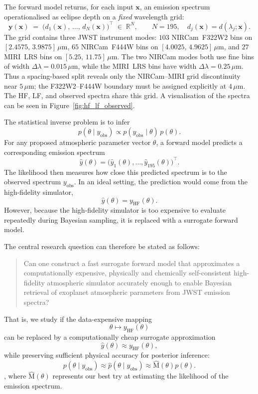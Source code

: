 \documentclass[11pt,a4paper]{article}
\newcommand{\xv}{\bm{x}}
\newcommand{\yv}{\bm{y}}
\begin{document}
The forward model returns, for each input $\xv$, an emission spectrum
operationalised as eclipse depth on a \emph{fixed} wavelength grid:
\[
    \yv(\xv) \;=\; \bigl(d_{1}(\xv),\,\dots,\,d_{N}(\xv)\bigr)^{\!\top}
    \;\in\; \mathbb{R}^{N},
    \qquad N=195,\quad d_{j}(\xv) = d(\lambda_{j};\xv).
\]
The grid contains three JWST instrument modes: $103$ NIRCam~F322W2 bins on $[2.4575,\,3.9875]\,\mu$m, $65$ NIRCam~F444W bins on $[4.0025,\,4.9625]\,\mu$m, and $27$ MIRI~LRS bins on $[5.25,\,11.75]\,\mu$m. The two NIRCam modes both use fine bins of width $\Delta\lambda=0.015\,\mu$m, while the MIRI~LRS bins have width $\Delta\lambda=0.25\,\mu$m. Thus a spacing-based split reveals only the NIRCam--MIRI grid discontinuity near $5\,\mu$m; the F322W2--F444W boundary must be assigned explicitly at $4\,\mu$m. The HF, LF, and observed spectra share this grid. A visualisation of the spectra can be seen in Figure~\ref{fig:hf_lf_observed}.

The statistical inverse problem is to infer
\[
p(\theta \mid y_{\mathrm{obs}})
\propto
p(y_{\mathrm{obs}}\mid \theta)\,p(\theta).
\]
For any proposed atmospheric parameter vector \(\theta\), a forward model predicts a corresponding emission spectrum
\[
\widehat y(\theta)
=
\bigl(\widehat y_1(\theta),\ldots,\widehat y_{195}(\theta)\bigr)^\top.
\]
The likelihood then measures how close this predicted spectrum is to the observed spectrum \(y_{\mathrm{obs}}\). In an ideal setting, the prediction would come from the high-fidelity simulator,
\[
\widehat y(\theta)=y_{\mathrm{HF}}(\theta).
\]
However, because the high-fidelity simulator is too expensive to evaluate repeatedly during Bayesian sampling, it is replaced with a surrogate forward model.


The central research question can therefore be stated as follows:

\begin{quote}
Can one construct a fast surrogate forward model that approximates a computationally expensive, physically and chemically self-consistent high-fidelity atmospheric simulator accurately enough to enable Bayesian retrieval of exoplanet atmospheric parameters from JWST emission spectra?
\end{quote}

That is, we study if the data-expensive mapping
\[
\theta \mapsto y_{\mathrm{HF}}(\theta)
\]
can be replaced by a computationally cheap surrogate approximation
\[
\widehat{y}(\theta) \approx y_{\mathrm{HF}}(\theta),
\]
while preserving sufficient physical accuracy for posterior inference:
\[
p(\theta \mid y_{\mathrm{obs}})
\approx
\hat{p}(\theta \mid y_{\mathrm{obs}})
\approx \hat{\mathrm{M}}(\theta)p(\theta).
\],
where \(\hat{\mathrm{M}}(\theta)\) represents our best try at estimating the likelihood of the emission spectrum.
\end{document}
